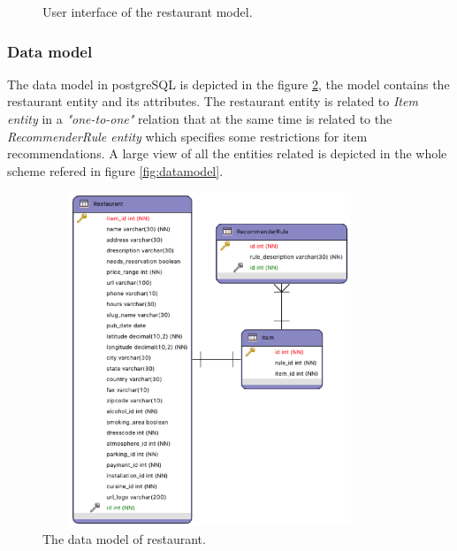 \begin{figure}
\captionsetup{justification=centering,margin=2cm}
\centering
\setlength\fboxsep{0pt}
\setlength\fboxrule{0.7pt}
\caption{User interface of the restaurant model.}
\label{fig:restaurantmodel}       
\end{figure}
\subsubsection{Data model} \label{datamodelsection}   
The data model in postgreSQL is depicted in the figure
\ref{fig:restaurantmodeldata}, the model contains the restaurant
entity and its attributes. The restaurant entity is related to
\textit{Item entity} in a \textit{"one-to-one"} relation that at the
same time is related to the \textit{RecommenderRule entity} which
specifies some restrictions for item recommendations. A large view of
all the entities related is depicted in the whole scheme refered in
figure \ref{fig:datamodel}.
\begin{figure}
\captionsetup{justification=centering,margin=2cm}
\centering
\includegraphics[width=10cm,height=10cm,keepaspectratio]{img/data-resmodel.png}
\caption{The data model of restaurant.}
\label{fig:restaurantmodeldata}     
\end{figure}


